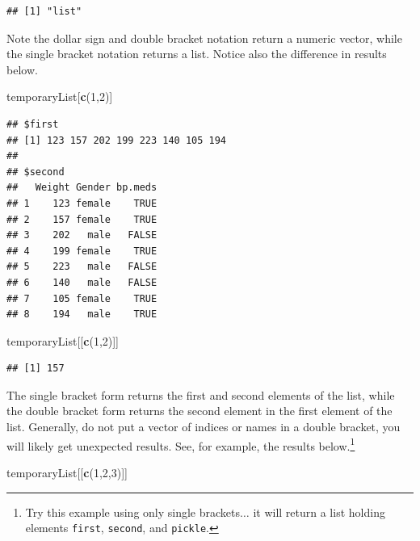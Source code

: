 \documentclass[
]{krantz}
\newenvironment{Shaded}{\begin{snugshade}}{\end{snugshade}}
\newcommand{\DecValTok}[1]{\textcolor[rgb]{0.00,0.00,0.81}{#1}}
\newcommand{\KeywordTok}[1]{\textcolor[rgb]{0.13,0.29,0.53}{\textbf{#1}}}
\newcommand{\NormalTok}[1]{#1}
\begin{document}
\begin{verbatim}
## [1] "list"
\end{verbatim}

Note the dollar sign and double bracket notation return a numeric vector, while the single bracket notation returns a list. Notice also the difference in results below.

\begin{Shaded}
\begin{Highlighting}[]
\NormalTok{temporaryList[}\KeywordTok{c}\NormalTok{(}\DecValTok{1}\NormalTok{,}\DecValTok{2}\NormalTok{)]}
\end{Highlighting}
\end{Shaded}

\begin{verbatim}
## $first
## [1] 123 157 202 199 223 140 105 194
## 
## $second
##   Weight Gender bp.meds
## 1    123 female    TRUE
## 2    157 female    TRUE
## 3    202   male   FALSE
## 4    199 female    TRUE
## 5    223   male   FALSE
## 6    140   male   FALSE
## 7    105 female    TRUE
## 8    194   male    TRUE
\end{verbatim}

\begin{Shaded}
\begin{Highlighting}[]
\NormalTok{temporaryList[[}\KeywordTok{c}\NormalTok{(}\DecValTok{1}\NormalTok{,}\DecValTok{2}\NormalTok{)]]}
\end{Highlighting}
\end{Shaded}

\begin{verbatim}
## [1] 157
\end{verbatim}

The single bracket form returns the first and second elements of the list, while the double bracket form returns the second element in the first element of the list. Generally, do not put a vector of indices or names in a double bracket, you will likely get unexpected results. See, for example, the results below.\footnote{Try this example using only single brackets\(\ldots\) it will return a list holding elements \texttt{first}, \texttt{second}, and \texttt{pickle}.}

\begin{Shaded}
\begin{Highlighting}[]
\NormalTok{temporaryList[[}\KeywordTok{c}\NormalTok{(}\DecValTok{1}\NormalTok{,}\DecValTok{2}\NormalTok{,}\DecValTok{3}\NormalTok{)]]}
\end{Highlighting}
\end{Shaded}
\end{document}
